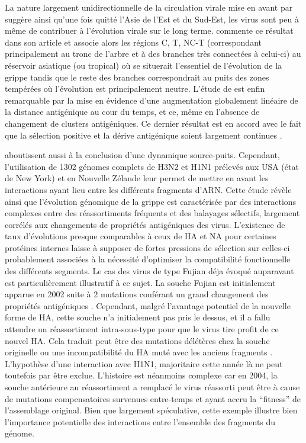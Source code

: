 La nature largement unidirectionnelle de la circulation virale mise en
avant par \citet{Russell2008} suggère ainsi qu'une fois quitté l'Asie
de l'Est et du Sud-Est, les virus sont peu à même de contribuer à
l'évolution virale sur le long terme.  \citet{Suzuki2008} commente ce
résultat dans son article et associe alors les régions C, T, NC-T
(correspondant principalement au tronc de l'arbre et à des branches
très connectées à celui-ci) au réservoir asiatique (ou tropical) où se
situerait l'essentiel de l'évolution de la grippe tandis que le reste
des branches correspondrait au puits des zones tempérées où
l'évolution est principalement neutre.  L'étude de \citet{Russell2008}
est enfin remarquable par la mise en évidence d'une augmentation
globalement linéaire de la distance antigénique au cour du temps, et
ce, même en l'absence de changement de clusters antigéniques. Ce
dernier résultat est en accord avec le fait que la sélection positive
et la dérive antigénique soient largement continues \citep{Shih2007,
  Suzuki2008}.

\citet{Rambaut2008} aboutissent aussi à la conclusion d'une dynamique
source-puits. Cependant, l'utilisation de 1302 génomes complets de
H3N2 et H1N1 prélevés aux USA (état de New York) et en Nouvelle
Zélande leur permet de mettre en avant les interactions ayant lieu
entre les différents fragments d'ARN. Cette étude révèle ainsi que
l'évolution génomique de la grippe est caractérisée par des
interactions complexes entre des réassortiments fréquents et des
balayages sélectifs, largement corrélés aux changements de propriétés
antigéniques des virus. L'existence de taux d'évolutions presque
comparables à ceux de HA et NA pour certaines protéines internes
laisse à supposer de fortes pressions de sélection sur celles-ci
probablement associées à la nécessité d'optimiser la compatibilité
fonctionnelle des différents segments.  Le cas des virus de type
Fujian déja évoqué auparavant est particulièrement illustratif à ce
sujet. La souche Fujian est initialement apparue en 2002 suite à 2
mutations conférant un grand changement des propriétés antigéniques
\citep{Jin2005}. Cependant, malgré l'avantage potentiel de la nouvelle
forme de HA, cette souche n'a initialement pas pris le dessus, et il a
fallu attendre un réassortiment intra-sous-type pour que le virus tire
profit de ce nouvel HA. Cela traduit peut être des mutations délétères
chez la souche originelle ou une incompatibilité du HA muté avec les
anciens fragments \citep{Holmes2005}. L'hypothèse d'une interaction
avec H1N1, majoritaire cette année là ne peut toutefois par être
exclue. L'histoire est néanmoins complexe car en 2004, la souche
antérieure au réassortiment a remplacé le virus réassorti peut être à
cause de mutations compensatoires survenues entre-temps et ayant accru
la ``fitness'' de l'assemblage original. Bien que largement
spéculative, cette exemple illustre bien l'importance potentielle des
interactions entre l'ensemble des fragments du génome.


